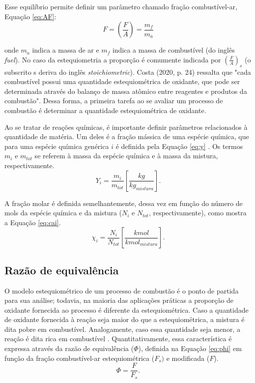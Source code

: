 Esse equilíbrio permite definir um parâmetro chamado fração combustível-ar, Equação \eqref{eq:AF}:
\begin{equation} \label{eq:AF}
F = \left(\frac{F}{A}\right) = \frac{m_f}{m_a} 
\end{equation}

\noindent onde $m_a$ indica a massa de ar e $m_f$ indica a massa de combustível (do inglês \textit{fuel}). No caso da estequiometria a proporção é comumente indicada por $\left(\frac{F}{A}\right)_{s}$ (o subscrito s deriva do inglês \textit{stoichiometric}).
Costa (2020, p. 24) ressalta que "cada combustível possui uma quantidade estequiométrica de oxidante, que pode ser determinada através do balanço de massa atômico entre reagentes e produtos da combustão". Dessa forma, a primeira tarefa ao se avaliar um processo de combustão é determinar a quantidade estequiométrica de oxidante.

Ao se tratar de reações químicas, é importante definir parâmetros relacionados à quantidade de matéria. Um deles é a fração mássica de uma espécie química, que para uma espécie química genérica $i$ é definida pela Equação \eqref{eq:y} \cite{Turns}. Os termos $m_i$ e $m_{tot}$ se referem à massa da espécie química e à massa da mistura, respectivamente.
\begin{equation} \label{eq:y}
Y_{i} = \frac{m_i}{m_{tot}} \left[\frac{kg}{kg_{mistura}}\right].
\end{equation}

A fração molar é definida semelhantemente, dessa vez em função do número de mols da espécie química e da mistura ($N_i$ e $N_{tot}$, respectivamente), como mostra a Equação \eqref{eq:cai}.
\begin{equation} \label{eq:cai}
\chi_{i} = \frac{N_i}{N_{tot}} \left[\frac{kmol}{kmol_{mistura}}\right].
\end{equation}

\subsection{Razão de equivalência}
O modelo estequiométrico de um processo de combustão é o ponto de partida para sua análise; todavia, na maioria das aplicações práticas a proporção de oxidante fornecida ao processo é diferente da estequiométrica. Caso a quantidade de oxidante fornecida à reação seja maior do que a estequiométrica, a mistura é dita pobre em combustível. Analogamente, caso essa quantidade seja menor, a reação é dita rica em combustível \cite{Turns}. Quantitativamente, essa característica é expressa através da razão de equivalência ($\Phi$), definida na Equação \eqref{eq:phi} em função da fração combustível-ar estequiométrica ($F_s)$ e modificada ($F$).
\begin{equation} \label{eq:phi}
\Phi = \frac{F}{F_{s}} .
\end{equation}

